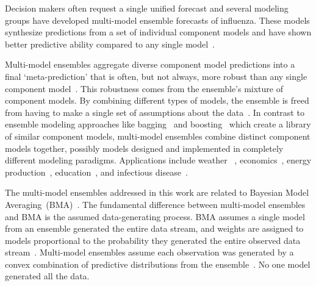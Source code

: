 \documentclass[sagev,times,Review,10pt]{sagej}
\begin{document}
Decision makers often request a single unified forecast and several modeling groups have developed multi-model ensemble forecasts of influenza. 
These models synthesize predictions from a set of individual component models and have shown better predictive ability compared to any single model~\cite{yamana2017individual,ray2018prediction,reich2019collaborative}.

Multi-model ensembles aggregate diverse component model predictions into a final `meta-prediction' that is often, but not always, more robust than any single component model~\cite{zhou2012ensemble,sewell2008ensemble}.
This robustness comes from the ensemble's mixture of component models.
By combining different types of models, the ensemble is freed from having to make a single set of assumptions about the data~\cite{zhou2012ensemble,sewell2008ensemble}.
In contrast to ensemble modeling approaches like 
bagging~\cite{breiman1996bagging,dietterich2000ensemble} and boosting~\cite{schapire2003boosting,dietterich2000ensemble} which create a library of similar component models, multi-model ensembles combine distinct component models together, possibly models designed and implemented in completely different modeling paradigms. Applications include weather ~\cite{krishnamurti1999improved}, economics~\cite{garratt2011real}, energy production~\cite{pierro2016multi}, education~\cite{adejo2018predicting}, and infectious disease~\cite{reich2019collaborative}. 

The multi-model ensembles addressed in this work are related to Bayesian Model Averaging~(BMA)~\cite{raftery2005using,steel2011bayesian,madigan1996bayesian,montgomery2010bayesian}.
The fundamental difference between multi-model ensembles and BMA is the assumed data-generating process. 
BMA assumes a single model from an ensemble generated the entire data stream, and weights are assigned to models proportional to the probability they generated the entire observed data stream~\cite{raftery2005using}.
Multi-model ensembles assume each observation was generated by a convex combination of predictive distributions from the ensemble~\cite{minka2000bayesian,bishop2006pattern,wallis2011combining}.
No one model generated all the data.
\end{document}
